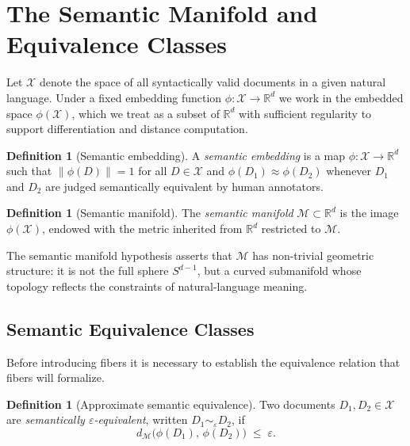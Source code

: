 \documentclass[12pt, a4paper]{article}
\theoremstyle{plain}
\theoremstyle{definition}
\newtheorem{definition}[theorem]{Definition}
\theoremstyle{remark}
\newcommand{\calX}{\mathcal{X}}
\newcommand{\calM}{\mathcal{M}}
\newcommand{\bR}{\mathbb{R}}
\newcommand{\ve}{\varepsilon}
\newcommand{\dM}{d_{\calM}}
\newcommand{\norm}[1]{\left\lVert #1 \right\rVert}
\begin{document}
\section{The Semantic Manifold and Equivalence Classes}
\label{sec:manifold}

Let $\calX$ denote the space of all syntactically valid documents in a given
natural language.  Under a fixed embedding function $\phi : \calX \to \bR^d$
we work in the embedded space $\phi(\calX)$, which we treat as a subset of
$\bR^d$ with sufficient regularity to support differentiation and distance
computation.

\begin{definition}[Semantic embedding]
\label{def:embedding}
A \emph{semantic embedding} is a map $\phi : \calX \to \bR^d$ such that
$\norm{\phi(D)} = 1$ for all $D \in \calX$ and $\phi(D_1) \approx \phi(D_2)$
whenever $D_1$ and $D_2$ are judged semantically equivalent by human annotators.
\end{definition}

\begin{definition}[Semantic manifold]
\label{def:manifold}
The \emph{semantic manifold} $\calM \subset \bR^d$ is the image $\phi(\calX)$,
endowed with the metric inherited from $\bR^d$ restricted to $\calM$.
\end{definition}

The semantic manifold hypothesis asserts that $\calM$ has non-trivial geometric
structure: it is not the full sphere $S^{d-1}$, but a curved submanifold
\cite{lee2013smooth, docarmo1992riemannian} whose topology reflects the
constraints of natural-language meaning.

\subsection{Semantic Equivalence Classes}

Before introducing fibers it is necessary to establish the equivalence relation
that fibers will formalize.

\begin{definition}[Approximate semantic equivalence]
\label{def:equiv}
Two documents $D_1, D_2 \in \calX$ are \emph{semantically $\ve$-equivalent},
written $D_1 \sim_\ve D_2$, if
\[
   \dM\bigl(\phi(D_1),\, \phi(D_2)\bigr) \;\le\; \ve.
\]
\end{definition}
\end{document}
